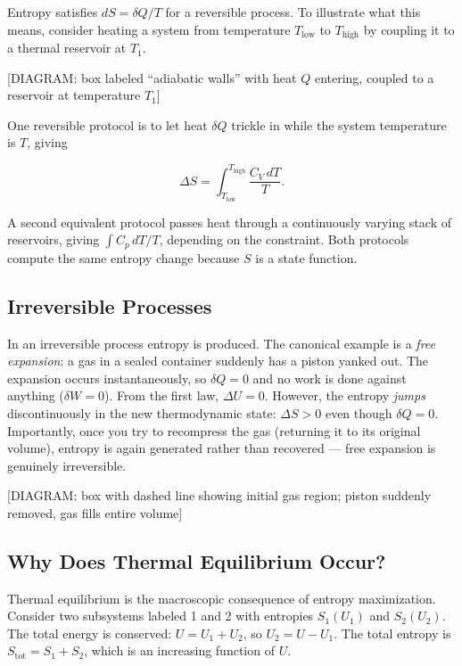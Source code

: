 Entropy satisfies $dS = \delta Q / T$ for a reversible process. To illustrate what this means, consider heating a system from temperature $T_{\mathrm{low}}$ to $T_{\mathrm{high}}$ by coupling it to a thermal reservoir at $T_1$.

\begin{center}[DIAGRAM: box labeled ``adiabatic walls'' with heat $Q$ entering, coupled to a reservoir at temperature $T_1$]\end{center}

One reversible protocol is to let heat $\delta Q$ trickle in while the system temperature is $T$, giving

\begin{equation}
  \Delta S = \int_{T_{\mathrm{low}}}^{T_{\mathrm{high}}} \frac{C_V\,dT}{T}.
\end{equation}

A second equivalent protocol passes heat through a continuously varying stack of reservoirs, giving $\int C_p\,dT/T$, depending on the constraint. Both protocols compute the same entropy change because $S$ is a state function.

\subsection{Irreversible Processes}

In an irreversible process entropy is produced. The canonical example is a \emph{free expansion}: a gas in a sealed container suddenly has a piston yanked out. The expansion occurs instantaneously, so $\delta Q = 0$ and no work is done against anything ($\delta W = 0$). From the first law, $\Delta U = 0$. However, the entropy \emph{jumps} discontinuously in the new thermodynamic state: $\Delta S > 0$ even though $\delta Q = 0$. Importantly, once you try to recompress the gas (returning it to its original volume), entropy is again generated rather than recovered — free expansion is genuinely irreversible.

\begin{center}[DIAGRAM: box with dashed line showing initial gas region; piston suddenly removed, gas fills entire volume]\end{center}

\subsection{Why Does Thermal Equilibrium Occur?}

Thermal equilibrium is the macroscopic consequence of entropy maximization. Consider two subsystems labeled 1 and 2 with entropies $S_1(U_1)$ and $S_2(U_2)$. The total energy is conserved: $U = U_1 + U_2$, so $U_2 = U - U_1$. The total entropy is $S_\text{tot} = S_1 + S_2$, which is an increasing function of $U$.

